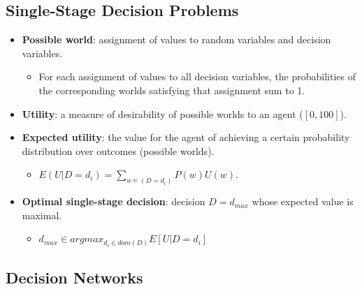\documentclass{article}
\begin{document}
\subsection{Single-Stage Decision Problems}
\begin{itemize}
    \item \textbf{Possible world}: assignment of values to random variables and decision variables.
        \begin{itemize}
            \item For each assignment of values to all decision variables, the probabilities of the corresponding worlds satisfying that assignment sum to 1.
        \end{itemize}
    \item \textbf{Utility}: a measure of desirability of possible worlds to an agent ($[0, 100]$).
    \item \textbf{Expected utility}: the value for the agent of achieving a certain probability distribution over outcomes (possible worlds).
        \begin{itemize}
            \item $E(U|D=d_i) = \sum\limits_{w \vDash (D=d_i)} P(w)U(w)$.
        \end{itemize}
    \item \textbf{Optimal single-stage decision}: decision $D=d_{max}$ whose expected value is maximal.
        \begin{itemize}
            \item $d_{max} \in argmax_{d_i \in dom(D)} E[U|D=d_i]$
        \end{itemize}
\end{itemize}

\subsection{Decision Networks}
\end{document}
